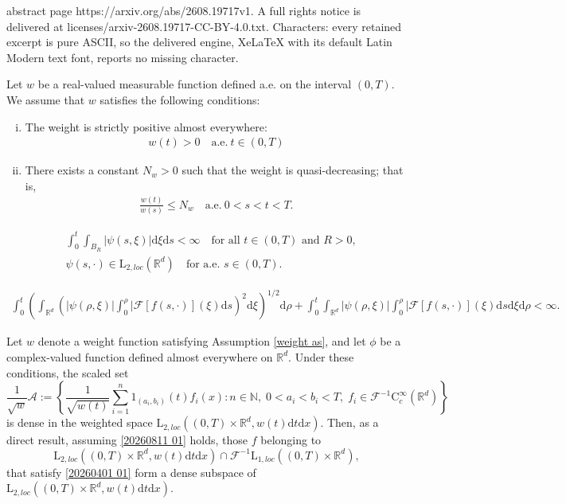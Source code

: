 \documentclass[10pt,a4paper]{amsart}
\newcommand\bN{\mathbb{N}}
\newcommand\bR{\mathbb{R}}
\newcommand\cA{\mathcal{A}}
\newcommand\cF{\mathcal{F}}
\begin{document}
abstract page https://arxiv.org/abs/2608.19717v1. A full rights notice is delivered at licenses/arxiv-2608.19717-CC-BY-4.0.txt. Characters: every retained excerpt is pure ASCII, so the delivered engine, XeLaTeX with its default Latin Modern text font, reports no missing character.
\begin{assumption}
										\label{weight as}
Let $w$ be a real-valued measurable function defined a.e. on the interval $(0,T)$. We assume that $w$ satisfies the following conditions:
\begin{enumerate}[(i)]
\item The weight is strictly positive almost everywhere:
\begin{align*}
w(t) >0 \quad \text{a.e.}~ t \in (0,T)
\end{align*}
\item There exists a constant $N_w > 0$ such that the weight is quasi-decreasing; that is,
\begin{align*}
\frac{w(t)}{w(s)} \leq N_w \quad \text{a.e.}~ 0<s<t<T.
\end{align*}
\end{enumerate}
\end{assumption}

\begin{equation}
										\label{20260811 01}
\begin{aligned}
&\int_0^t \int_{B_R} |\psi(s,\xi)|\mathrm{d}\xi \mathrm{d}s < \infty
\quad \text{for all } t \in (0,T) \text{ and } R > 0,\\
&\psi(s,\cdot)\in \mathrm{L}_{2,loc}(\bR^d)
\quad \text{for a.e. }s\in(0,T).
\end{aligned}
\end{equation}

\begin{align}
									\label{20260401 01}
\int_0^t  \left(\int_{\bR^d}  \left( |\psi(\rho,\xi)| \int_0^\rho |\cF[f(s,\cdot)](\xi) \mathrm{d}s\right)^2  \mathrm{d}\xi \right)^{1/2} \mathrm{d}\rho
+\int_0^t  \int_{\bR^d}   |\psi(\rho,\xi)| \int_0^\rho |\cF[f(s,\cdot)](\xi) \mathrm{d}s  \mathrm{d}\xi \mathrm{d}\rho
<\infty.
\end{align}

\begin{corollary}
									\label{dense cor}
Let $w$ denote a weight function satisfying Assumption \ref{weight as}, and let $\phi$ be a complex-valued function defined almost everywhere on $\bR^d$. 
Under these conditions, the scaled set
$$
\frac{1}{\sqrt{w}} \cA := \left\{ \frac{1}{\sqrt{w(t)}} \sum_{i=1}^n 1_{(a_i,b_i)}(t) f_i(x) : n \in \bN, \; 0 < a_i < b_i < T, \; f_i \in \cF^{-1}\mathrm{C}_c^\infty(\bR^d) \right\}
$$
is dense in the weighted space $\mathrm{L}_{2,loc}\left( (0,T) \times \bR^d, w(t)\mathrm{d}t\mathrm{d}x \right)$.
Then, as a direct result, assuming \eqref{20260811 01} holds, those $f$ belonging to
 $$
\mathrm{L}_{2,loc}\left( (0,T) \times \bR^d, w(t)\mathrm{d}t \mathrm{d}x \right)\cap \cF^{-1}\mathrm{L}_{1,loc}\left( (0,T) \times \bR^d \right), 
$$ 
that satisfy \eqref{20260401 01} form a dense subspace of $\mathrm{L}_{2,loc}\left( (0,T) \times \bR^d, w(t)\mathrm{d}t\mathrm{d}x \right)$.
\end{corollary}
\end{document}
